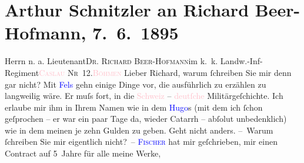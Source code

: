 

               \section[Arthur Schnitzler an Richard Beer-Hofmann, 7. 6. 1895]{ Arthur Schnitzler an Richard Beer-Hofmann, 7. 6. 1895}\nopagebreak{}\rehead{ }\normalsize\beginnumbering{} \toendnotes[C]{\smallbreak\pagebreak[2]} 
\toendnotes[C]{\smallbreak}\pstart{}Herrn n. a. Lieutenant\pend{}\pstart{}{\pb}\textsc{Dr. Richard Beer-Hofmann}\pend{}\pstart{}im k. k. Landw.-Inf-Regiment\pend{}\pstart{}\textsc{\textcolor{pink}{Caslau}{}\ledrightnote{\textcolor{pink}{Caslau}} Nr 12}.\pend{}\pstart{}\textsc{\textcolor{pink}{Böhmen}{}\ledrightnote{\textcolor{pink}{Böhmen}}}\pend{}{\bigskip}\pstart
           \noindent{}{\pb}Lieber Richard, warum ſchreiben Sie mir denn gar nicht?\pend
           \pstart
           Mit \textcolor{blue}{Fels}{}\ledrightnote{\textcolor{blue}{Friedrich Michael Fels}} gehn einige Dinge vor, die ausführlich zu
               erzählen zu langweilig wäre. Er muſs fort, in die \textcolor{pink}{Schweiz}{}\ledrightnote{\textcolor{pink}{Schweiz}} – \textcolor{pink}{deutſche}{}\ledrightnote{\textcolor{pink}{Deutschland}} Militärgeſchichte. Ich
               erlaube mir ihm in Ihrem Namen wie in dem \textcolor{blue}{Hugo}{}\ledrightnote{\textcolor{blue}{Hugo von Hofmannsthal}}s
               (mit dem ich ſchon geſprochen – er war ein paar Tage da, wieder Catarrh – abſolut
               unbedenklich) wie in dem meinen je zehn Gulden zu geben. Geht nicht anders.\pend
           \pstart
           {\pb}– Warum ſchreiben Sie mir eigentlich nicht? –\pend
           \pstart
           \textcolor{blue}{\textsc{Fischer}}{}\ledrightnote{\textcolor{blue}{Samuel Fischer}} hat mir geſchrieben, mir einen Contract auf 5 Jahre für alle meine Werke,
